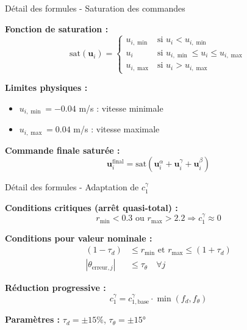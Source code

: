 \begin{frame}{Détail des formules - Saturation des commandes}

\textbf{Fonction de saturation :}
\begin{equation}
\text{sat}(\mathbf{u}_i) = \begin{cases}
u_{i,\min} & \text{si } u_i < u_{i,\min} \\
u_i & \text{si } u_{i,\min} \leq u_i \leq u_{i,\max} \\
u_{i,\max} & \text{si } u_i > u_{i,\max}
\end{cases}
\end{equation}

\textbf{Limites physiques :}
\begin{itemize}
\item $u_{i,\min} = -0.04$ m/s : vitesse minimale
\item $u_{i,\max} = 0.04$ m/s : vitesse maximale
\end{itemize}

\textbf{Commande finale saturée :}
\begin{equation}
\mathbf{u}_i^{\text{final}} = \text{sat}(\mathbf{u}_i^{\alpha} + \mathbf{u}_i^{\gamma} + \mathbf{u}_i^{\beta})
\end{equation}

\end{frame}

\begin{frame}{Détail des formules - Adaptation de $c_1^\gamma$}

\textbf{Conditions critiques (arrêt quasi-total) :}
\begin{equation}
r_{\min} < 0.3 \text{ ou } r_{\max} > 2.2 \Rightarrow c_1^\gamma \approx 0
\end{equation}

\textbf{Conditions pour valeur nominale :}
\begin{align}
(1 - \tau_d) &\leq r_{\min} \text{ et } r_{\max} \leq (1 + \tau_d) \\
|\theta_{\text{erreur},j}| &\leq \tau_\theta \quad \forall j
\end{align}

\textbf{Réduction progressive :}
\begin{equation}
c_1^\gamma = c_{1,\text{base}}^\gamma \cdot \min(f_d, f_\theta)
\end{equation}

\textbf{Paramètres :} $\tau_d = \pm 15\%$, $\tau_\theta = \pm 15°$

\end{frame}

